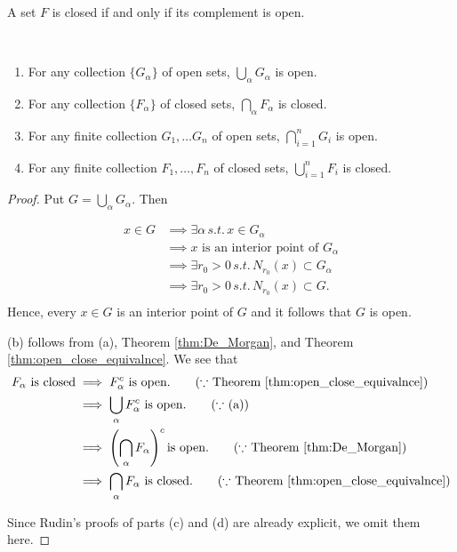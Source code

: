  \begin{corollary}
    A set $F$ is closed if and only if its complement is open.
 \end{corollary}

 \begin{theorem}\label{thm:topological_space_property}
    \,
    \begin{enumerate}
    \item[(a)] For any collection $\{G_{\alpha}\}$ of open sets, $\bigcup_{\alpha}G_{\alpha}$ is open.
    \item[(b)] For any collection  $\{F_{\alpha}\}$ of closed sets, $\bigcap_{\alpha}F_{\alpha}$ is closed.
    \item[(c)] For any finite collection $G_1, \ldots G_n$ of open sets, $\bigcap_{i=1}^nG_i$ is open.
    \item[(d)] For any finite collection $F_1, \ldots, F_n$ of closed sets, $\bigcup_{i=1}^nF_i$ is closed.
    \end{enumerate}
 \end{theorem}
\begin{proof}
Put $G=\bigcup_{\alpha}G_{\alpha}$. Then

\begin{align*}
    x \in G &\implies \exists\alpha \, s.t. \, x \in G_\alpha \\
    &\implies x \text{ is an interior point of } G_\alpha \\
    &\implies \exists r_0>0 \, s.t. \, N_{r_0}(x)\subset G_{\alpha} \\
    &\implies \exists r_0>0 \, s.t. \, N_{r_0}(x)\subset G.\\
\end{align*}
Hence, every $x \in G$ is an interior point of $G$ and it follows that $G$ is open. 

(b) follows from (a), Theorem \ref{thm:De_Morgan}, and Theorem \ref{thm:open_close_equivalnce}. We see that
\begin{align*}
    F_{\alpha} \text{ is closed} &\implies F_{\alpha}^c \text{ is open.} \tag*{($\because$ Theorem \ref{thm:open_close_equivalnce})} \\
    &\implies \bigcup_{\alpha}F_{\alpha}^c \text{ is open.} \tag*{($\because$ (a))} \\
    &\implies \left(\bigcap_{\alpha}F_{\alpha}\right)^c \text{is open.} \tag*{($\because$ Theorem \ref{thm:De_Morgan})}\\
    &\implies \bigcap_{\alpha}F_{\alpha} \text{ is closed.} \tag*{($\because$ Theorem \ref{thm:open_close_equivalnce})} \\
\end{align*}

Since Rudin's proofs of parts (c) and (d) are already explicit, we omit them here.
\end{proof}
